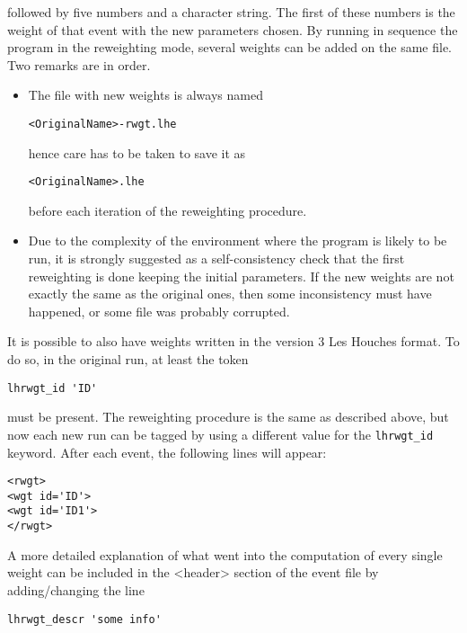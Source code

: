 followed by five numbers and a character string. The first of these 
numbers is the weight of that event with the new parameters chosen. By 
running in sequence the program in the reweighting mode, several 
weights can be added on the same file. Two remarks are in order.

\begin{itemize} 

\item The file with new weights is always named 
\begin{verbatim}
<OriginalName>-rwgt.lhe
\end{verbatim}
hence care has to be taken to save it as 
\begin{verbatim}
<OriginalName>.lhe
\end{verbatim}
before each iteration of the reweighting procedure. 

\item Due to the complexity of the environment where the program is 
likely to be run, it is strongly suggested as a self-consistency check 
that the first reweighting is done keeping the initial parameters. If 
the new weights are not exactly the same as the original ones, then 
some inconsistency must have happened, or some file was probably 
corrupted. 

\end{itemize} 

\noindent It is possible to also have weights written in the version 3 Les Houches format. 
To do so, in the original run, at least the token 

\begin{verbatim}
lhrwgt_id 'ID'
\end{verbatim}
must be present. The reweighting procedure is the same as described 
above, but now each new run can be tagged by using a different value 
for the \texttt{lhrwgt\_id} keyword. After each event, the following lines will 
appear: 

\begin{verbatim}
<rwgt> 
<wgt id='ID'>
<wgt id='ID1'>
</rwgt> 
\end{verbatim}

A more detailed explanation of what went into the computation of every 
single weight can be included in the <header> section of the event 
file by adding/changing the line 

\begin{verbatim}
lhrwgt_descr 'some info'
\end{verbatim}

